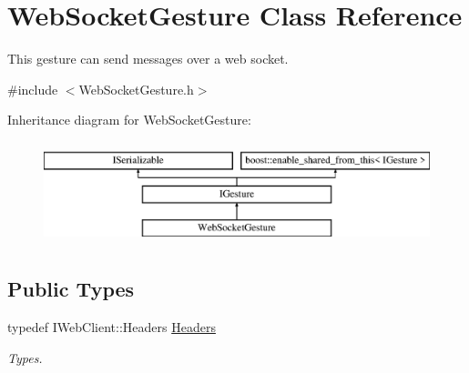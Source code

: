 \hypertarget{class_web_socket_gesture}{}\section{Web\+Socket\+Gesture Class Reference}
\label{class_web_socket_gesture}


This gesture can send messages over a web socket.  




{\ttfamily \#include $<$Web\+Socket\+Gesture.\+h$>$}

Inheritance diagram for Web\+Socket\+Gesture\+:\begin{figure}[H]
\begin{center}
\leavevmode
\includegraphics[height=3.000000cm]{class_web_socket_gesture}
\end{center}
\end{figure}
\subsection*{Public Types}
\begin{DoxyCompactItemize}
\item 
\mbox{\label{class_web_socket_gesture_a0cc08ce65d72a224166d68550a7979ed}} 
typedef I\+Web\+Client\+::\+Headers \hyperlink{class_web_socket_gesture_a0cc08ce65d72a224166d68550a7979ed}{Headers}
\begin{DoxyCompactList}\small\item\em Types. \end{DoxyCompactList}\end{DoxyCompactItemize}
